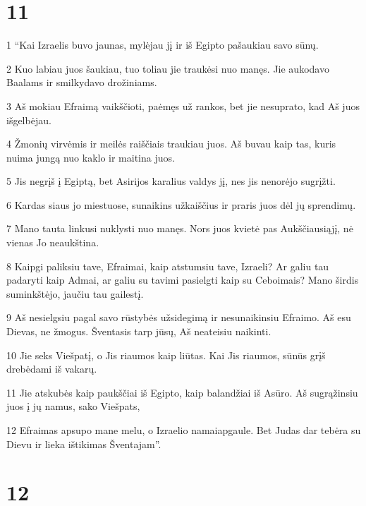 \chapter{11}


\par 1 “Kai Izraelis buvo jaunas, mylėjau jį ir iš Egipto pašaukiau savo sūnų. 
\par 2 Kuo labiau juos šaukiau, tuo toliau jie traukėsi nuo manęs. Jie aukodavo Baalams ir smilkydavo drožiniams. 
\par 3 Aš mokiau Efraimą vaikščioti, paėmęs už rankos, bet jie nesuprato, kad Aš juos išgelbėjau. 
\par 4 Žmonių virvėmis ir meilės raiščiais traukiau juos. Aš buvau kaip tas, kuris nuima jungą nuo kaklo ir maitina juos. 
\par 5 Jis negrįš į Egiptą, bet Asirijos karalius valdys jį, nes jis nenorėjo sugrįžti. 
\par 6 Kardas siaus jo miestuose, sunaikins užkaiščius ir praris juos dėl jų sprendimų. 
\par 7 Mano tauta linkusi nuklysti nuo manęs. Nors juos kvietė pas Aukščiausiąjį, nė vienas Jo neaukština. 
\par 8 Kaipgi paliksiu tave, Efraimai, kaip atstumsiu tave, Izraeli? Ar galiu tau padaryti kaip Admai, ar galiu su tavimi pasielgti kaip su Ceboimais? Mano širdis suminkštėjo, jaučiu tau gailestį. 
\par 9 Aš nesielgsiu pagal savo rūstybės užsidegimą ir nesunaikinsiu Efraimo. Aš esu Dievas, ne žmogus. Šventasis tarp jūsų, Aš neateisiu naikinti. 
\par 10 Jie seks Viešpatį, o Jis riaumos kaip liūtas. Kai Jis riaumos, sūnūs grįš drebėdami iš vakarų. 
\par 11 Jie atskubės kaip paukščiai iš Egipto, kaip balandžiai iš Asūro. Aš sugrąžinsiu juos į jų namus,­ sako Viešpats,­ 
\par 12 Efraimas apsupo mane melu, o Izraelio namai­apgaule. Bet Judas dar tebėra su Dievu ir lieka ištikimas Šventajam”.



\chapter{12}


